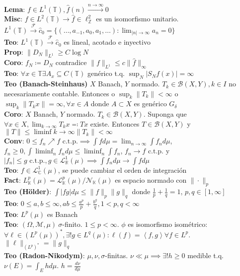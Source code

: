 \documentclass[9pt, letterpaper]{extarticle}
\newcommand{\C}{\mathbb{C}}
\newcommand{\R}{\mathbb{R}}
\newcommand{\K}{\mathbb{K}}
\newcommand{\Z}{\mathbb{Z}}
\newcommand{\T}{\mathbb{T}}
\newcommand{\F}{\mathcal{F}}
\newcommand{\inn}[1]{\left\langle #1\right\rangle}
\begin{document}
\begin{multicols*}{2}
\textbf{Lema}: $f\in L^1(\T),\hat f(n)\xrightarrow{n\to\infty}0$\\
\textbf{Misc}: $f\in L^2(\T)\to \hat f\in \ell^2_\Z$ es un isomorfismo unitario. $L^1(\T)\xrightarrow{\F} \hat c_0=\{(\ldots,a_{-1},a_0,a_1,\ldots):\lim_{|n|\to\infty} a_n=0\}$\\
\textbf{Teo}: $L^1(\T)\xrightarrow{\F}\hat c_0$ es lineal, acotado e inyectivo\\
\textbf{Prop}: $\|D_N\|_{L^1}\geq C\log N$\\
\textbf{Coro}: $f_N\coloneqq D_N$ contradice $\|f\|_{L^1}\leq c\|\hat f\|_{\infty}$\\
\textbf{Teo}: $\forall x\in\T\exists A_x\subseteq C(\T)$ genérico t.q. $\sup_N|S_N f(x)|=\infty$\\
\textbf{\color{red}Teo (Banach-Steinhaus)} $X$ Banach, $Y$ normado. $T_k\in\mathcal{B}(X,Y),k\in I$ no necesariamente contable. Entonces o $\sup_{k}\|T_k\|<\infty$ o $\sup_k\|T_kx\|=\infty,\forall x\in A$ donde $A\subset X$ es genérico $G_\delta$\\
\textbf{Coro}: $X$ Banach, $Y$ normado. $T_k\in\mathcal{B}(X,Y)$. Suponga que $\forall x\in X, \lim_{k\to\infty} T_k x\eqqcolon Tx$ existe. Entonces $T\in\mathcal{B}(X,Y)$ y $\|T\|\leq \liminf{k\to\infty} \|T_k\|<\infty$\\
\textbf{Conv}: $0\leq f_n\nearrow f\text{ c.t.p.}\implies \int fd\mu=\lim_{n\to\infty}\int f_nd\mu$, $f_n\geq 0,\int\liminf_n f_nd\mu\leq\liminf_n\int f_n$, $f_n\to f\text{ c.t.p.}$ y $|f_n|\leq g\text{ c.t.p.},g\in \mathcal{L}^1_\R(\mu)\implies \int f_nd\mu\to\int fd\mu$\\
\textbf{Teo}: $f\in\mathcal{L}^1_\C(\mu)$, se puede cambiar el orden de integración\\
\textbf{Fact}: $L^p_\K(\mu)=\mathcal{L}_\K^p(\mu)/\mathcal{N}_\K(\mu)$ es espacio normado con $\|\cdot\|_p$\\
\textbf{\color{red}Teo (Hölder)}: $\int |fg|d\mu\leq \|f\|_p\|g\|_q$ donde $\frac{1}{p}+\frac{1}{q}=1$, $p,q\in [1,\infty]$\\
\textbf{Teo}: $0\leq a,b\leq \infty, ab\leq \frac{a^p}{p}+\frac{b^q}{q},1<p,q<\infty$\\
\textbf{Teo}: $L^p(\mu)$ es Banach\\
\textbf{\color{red}Teo}: $(\Omega,\mathcal{M},\mu)\  \sigma$-finito. $1\leq p<\infty$. $\phi$ es isomorfismo isométrico: $\forall\ell\in (L^p(\mu))^*,\exists!g\in L^q(\mu):\ell(f)=\inn{f,g}\forall f\in L^p$. $\|\ell\|_{(L^p)^*}=\|g\|_q$\\
\textbf{Teo (Radon-Nikodym)}: $\mu,\nu,\sigma$-finitas. $\nu\ll\mu\implies \exists!h\geq 0$ medible t.q. $\nu(E)=\int_Ehd\mu$. $h=\frac{d\nu}{d\mu}$\\

\end{multicols*}
\end{document}
